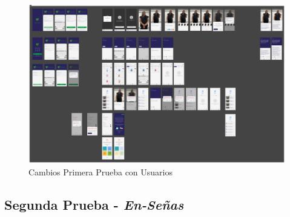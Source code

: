 \begin{figure} [H]
    \centering
    \includegraphics[width=1\linewidth]{figuras/prototipo_cambios1.png}
    \caption{Cambios Primera Prueba con Usuarios}
    \label{fig:enter-label}
\end{figure}


\subsection{Segunda Prueba - \textit{En-Señas}}


